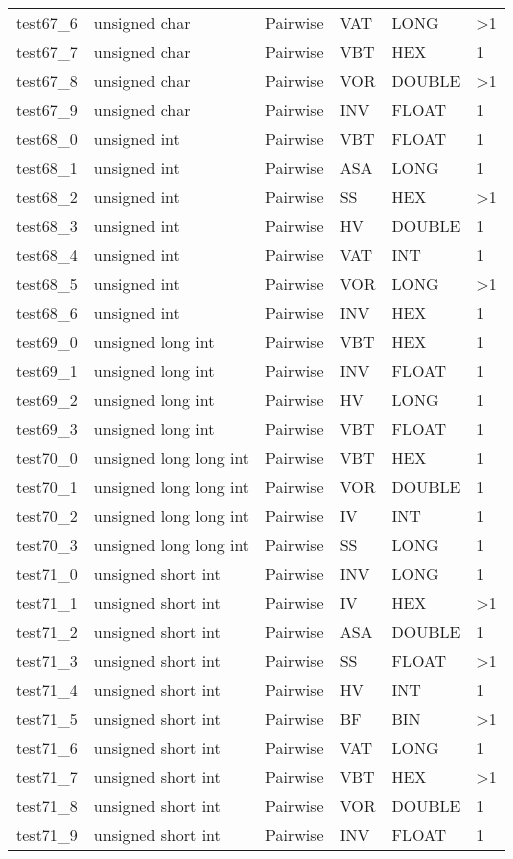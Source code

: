\begin{longtable}{|l|l|l|l|l|l|}
test67\_6 & unsigned char & Pairwise & VAT & LONG & \textgreater{}1 \\
test67\_7 & unsigned char & Pairwise & VBT & HEX & 1 \\
test67\_8 & unsigned char & Pairwise & VOR & DOUBLE & \textgreater{}1 \\
test67\_9 & unsigned char & Pairwise & INV & FLOAT & 1 \\
test68\_0 & unsigned int & Pairwise & VBT & FLOAT & 1 \\
test68\_1 & unsigned int & Pairwise & ASA & LONG & 1 \\
test68\_2 & unsigned int & Pairwise & SS & HEX & \textgreater{}1 \\
test68\_3 & unsigned int & Pairwise & HV & DOUBLE & 1 \\
test68\_4 & unsigned int & Pairwise & VAT & INT & 1 \\
test68\_5 & unsigned int & Pairwise & VOR & LONG & \textgreater{}1 \\
test68\_6 & unsigned int & Pairwise & INV & HEX & 1 \\
test69\_0 & unsigned long int & Pairwise & VBT & HEX & 1 \\
test69\_1 & unsigned long int & Pairwise & INV & FLOAT & 1 \\
test69\_2 & unsigned long int & Pairwise & HV & LONG & 1 \\
test69\_3 & unsigned long int & Pairwise & VBT & FLOAT & 1 \\
test70\_0 & unsigned long long int & Pairwise & VBT & HEX & 1 \\
test70\_1 & unsigned long long int & Pairwise & VOR & DOUBLE & 1 \\
test70\_2 & unsigned long long int & Pairwise & IV & INT & 1 \\
test70\_3 & unsigned long long int & Pairwise & SS & LONG & 1 \\
test71\_0 & unsigned short int & Pairwise & INV & LONG & 1 \\
test71\_1 & unsigned short int & Pairwise & IV & HEX & \textgreater{}1 \\
test71\_2 & unsigned short int & Pairwise & ASA & DOUBLE & 1 \\
test71\_3 & unsigned short int & Pairwise & SS & FLOAT & \textgreater{}1 \\
test71\_4 & unsigned short int & Pairwise & HV & INT & 1 \\
test71\_5 & unsigned short int & Pairwise & BF & BIN & \textgreater{}1 \\
test71\_6 & unsigned short int & Pairwise & VAT & LONG & 1 \\
test71\_7 & unsigned short int & Pairwise & VBT & HEX & \textgreater{}1 \\
test71\_8 & unsigned short int & Pairwise & VOR & DOUBLE & 1 \\
test71\_9 & unsigned short int & Pairwise & INV & FLOAT & 1 \\
\hline
\end{longtable}
\normalsize

